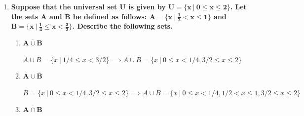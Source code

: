 \documentclass[10pt, oneside]{article}
\begin{document}
\begin{enumerate}[label=1.\arabic*]
\begin{enumerate}
	\item  \begin{tcolorbox}[
	  colback=Cerulean!5!white,
	  colframe=Cerulean!75!black]
	\textbf{$\bm{\overline{A \cap (B \cup C)}}$}
	\end{tcolorbox}
	
	\begin{align*}
	B \cup C = \{ 3, 4, 5, 6, 7 \} &\implies A \cap (B \cup C) = \{ 3, 4 \} \\
	&\implies \boxed{ \overline{A \cap (B \cup C)} = \{ 1, 2, 5, ..., 10 \} }
	\end{align*}
	
	\end{enumerate}

\item  \begin{tcolorbox}[
  colback=Cerulean!5!white,
  colframe=Cerulean!75!black]
\textbf{Suppose that the universal set $\bm{U}$ is given by $\bm{U = \{ x \ | \ 0 \leq x \leq 2 \}}$. Let the sets $\bm{A}$ and $\bm{B}$ be defined as follows: $\bm{A = \{ x \ | \ \frac{1}{2} < x \leq 1 \}}$ and $\bm{B = \{ x \ | \ \frac{1}{4} \leq x < \frac{3}{2} \}}$. Describe the following sets.}
\end{tcolorbox}

	\begin{enumerate}
	\item  \begin{tcolorbox}[
	  colback=Cerulean!5!white,
	  colframe=Cerulean!75!black]
	\textbf{$\bm{\overline{A \cup B}}$}
	\end{tcolorbox}
	
	$A \cup B = \{ x \ | \ 1/4 \leq x < 3/2 \} \implies \boxed{\overline{A \cup B} = \{ x \ | \ 0 \leq x < 1/4, 3/2 \leq x \leq 2 \} }$
	
	\item  \begin{tcolorbox}[
	  colback=Cerulean!5!white,
	  colframe=Cerulean!75!black]
	\textbf{$\bm{A \cup \overline{B}}$}
	\end{tcolorbox}
	
	$\overline{B} = \{ x \ | \ 0 \leq x < 1/4, 3/2 \leq x \leq 2 \} \implies \boxed{A \cup \overline{B} = \{ x \ | \ 0 \leq x < 1/4, 1/2 < x \leq 1, 3/2 \leq x \leq 2 \} }$
	
	\item  \begin{tcolorbox}[
	  colback=Cerulean!5!white,
	  colframe=Cerulean!75!black]
	\textbf{$\bm{\overline{A \cap B}}$}
	\end{tcolorbox}
	

\end{enumerate}
\end{enumerate}
\end{document}

